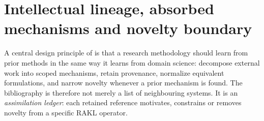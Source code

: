 \section{Intellectual lineage, absorbed mechanisms and novelty boundary}
A central design principle of \RAKL{} is that a research methodology should learn from prior methods in the same way it learns from domain science: decompose external work into scoped mechanisms, retain provenance, normalize equivalent formulations, and narrow novelty whenever a prior mechanism is found. The bibliography is therefore not merely a list of neighbouring systems. It is an \emph{assimilation ledger}: each retained reference motivates, constrains or removes novelty from a specific RAKL operator.





